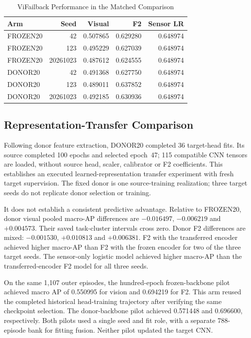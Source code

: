 \begin{table}[htbp]
\caption{ViFailback Performance in the Matched Comparison}\label{tab:vif-matched}
\centering\small

\begin{tabular}{lrrrr}\hline Arm&Seed&Visual&F2&Sensor LR\\\hline
FROZEN20&42&0.507865&0.629280&0.648974\\
FROZEN20&123&0.495229&0.627039&0.648974\\
FROZEN20&20261023&0.487612&0.624555&0.648974\\
DONOR20&42&0.491368&0.627750&0.648974\\
DONOR20&123&0.489011&0.637852&0.648974\\
DONOR20&20261023&0.492185&0.630936&0.648974\\\hline
\end{tabular}
\end{table}

\subsection{Representation-Transfer Comparison}
Following donor feature extraction, DONOR20 completed 36 target-head fits. Its source completed 100 epochs and selected epoch~47; 115 compatible CNN tensors are loaded, without source head, scaler, calibrator or F2 coefficients. This establishes an executed learned-representation transfer experiment with fresh target supervision. The fixed donor is one source-training realization; three target seeds do not replicate donor selection or training.

It does not establish a consistent predictive advantage. Relative to FROZEN20, donor visual pooled macro-AP differences are $-0.016497$, $-0.006219$ and $+0.004573$. Their saved task-cluster intervals cross zero. Donor F2 differences are mixed: $-0.001530$, $+0.010813$ and $+0.006381$. F2 with the transferred encoder achieved higher macro-AP than F2 with the frozen encoder for two of the three target seeds. The sensor-only logistic model achieved higher macro-AP than the transferred-encoder F2 model for all three seeds.

On the same 1,107 outer episodes, the hundred-epoch frozen-backbone pilot achieved macro AP of 0.550995 for vision and 0.694219 for F2. This arm reused the completed historical head-training trajectory after verifying the same checkpoint selection. The donor-backbone pilot achieved 0.571448 and 0.696600, respectively. Both pilots used a single seed and fit role, with a separate 788-episode bank for fitting fusion. Neither pilot updated the target CNN.

